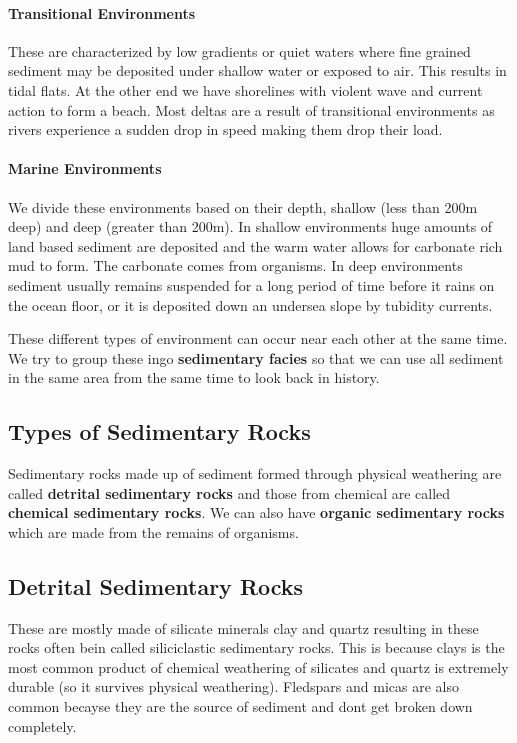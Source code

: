 \documentclass{article}
\begin{document}
 \paragraph{Transitional Environments} %
 \label{par:transitional_environments}
 These are characterized by low gradients or quiet waters where fine grained sediment may be deposited under shallow water or exposed to air. This results in tidal flats. At the other end we have shorelines with violent wave and current action to form a beach. Most deltas are a result of transitional environments as rivers experience a sudden drop in speed making them drop their load.

\paragraph{Marine Environments} %
\label{par:marine_environments}
We divide these environments based on their depth, shallow (less than 200m deep) and deep (greater than 200m). In shallow environments huge amounts of land based sediment are deposited and the warm water allows for carbonate rich mud to form. The carbonate comes from organisms. In deep environments sediment usually remains suspended for a long period of time before it rains on the ocean floor, or it is deposited down an undersea slope by tubidity currents.

These different types of environment can occur near each other at the same time. We try to group these ingo \textbf{sedimentary facies} so that we can use all sediment in the same area from the same time to look back in history.

\subsection{Types of Sedimentary Rocks} %
\label{sub:types_of_sedimentary_rocks}
Sedimentary rocks made up of sediment formed through physical weathering are called \textbf{detrital sedimentary rocks} and those from chemical are called \textbf{chemical sedimentary rocks}. We can also have \textbf{organic sedimentary rocks} which are made from the remains of organisms.

\subsection{Detrital Sedimentary Rocks} %
\label{sub:detrital_sedimentary_rocks}
These are mostly made of silicate minerals clay and quartz resulting in these rocks often bein called siliciclastic sedimentary rocks. This is because clays is the most common product of chemical weathering of silicates and quartz is extremely durable (so it survives physical weathering). Fledspars and micas are also common becayse they are the source of sediment and dont get broken down completely.
\end{document}
